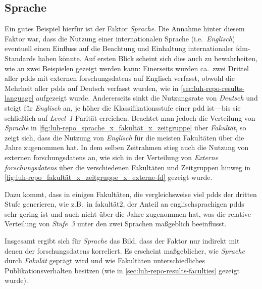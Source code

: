 \subsection{Sprache}
Ein gutes Beispiel hierfür ist der Faktor \textit{Sprache}.
Die Annahme hinter diesem Faktor war, dass die Nutzung einer internationalen Sprache (i.e.~\textit{Englisch}) eventuell einen Einfluss auf die Beachtung und Einhaltung internationaler \gls{fdm}-Standards haben könnte.
Auf ersten Blick scheint sich dies auch zu bewahrheiten, wie an zwei Beispielen gezeigt werden kann: 
Einerseits wurden ca.~zwei Drittel aller \glspl{pdd} mit externen \glspl{forschungsdaten} auf Englisch verfasst, obwohl die Mehrheit aller \glspl{pdd} auf Deutsch verfasst wurden, wie in \cref{sec:luh-repo-results-language} aufgezeigt wurde.
Andererseits sinkt die Nutzungsrate von \textit{Deutsch} und steigt für \textit{Englisch} an, je höher die Klassifikationsstufe einer \gls{pdd} ist---bis sie schließlich auf \textit{Level~1} Parität erreichen.
Beachtet man jedoch die Verteilung von \textit{Sprache} in \cref{fig:luh-repo_sprache_x_fakultät_x_zeitgruppe} über \textit{Fakultät}, so zeigt sich, dass die Nutzung von \textit{Englisch} für die meisten Fakultäten über die Jahre zugenommen hat.
In dem selben Zeitrahmen stieg auch die Nutzung von externen \glspl{forschungsdaten} an, wie sich in der Verteilung von \textit{Externe \glspl{forschungsdaten}} über die verschiedenen Fakultäten und Zeitgruppen hinweg in \cref{fig:luh-repo_fakultät_x_zeitgruppe_x_externe-fd} gezeigt wurde.

Dazu kommt, dass in einigen Fakultäten, die vergleichsweise viel \glspl{pdd} der dritten Stufe generieren, wie z.B.~in \gls{fakultät2}, der Anteil an englischsprachigen \glspl{pdd} sehr gering ist und auch nicht über die Jahre zugenommen hat, was die relative Verteilung von \textit{Stufe~3} unter den zwei Sprachen maßgeblich beeinflusst.

Insgesamt ergibt sich für \textit{Sprache} das Bild, dass der Faktor nur indirekt mit denen der \glspl{forschungsdaten} korreliert.
Es erscheint maßgeblicher, wie \textit{Sprache} durch \textit{Fakulät} geprägt wird und wie Fakultäten unterschiedliches Publikationsverhalten besitzen (wie in \cref{sec:luh-repo-results-faculties} gezeigt wurde).

